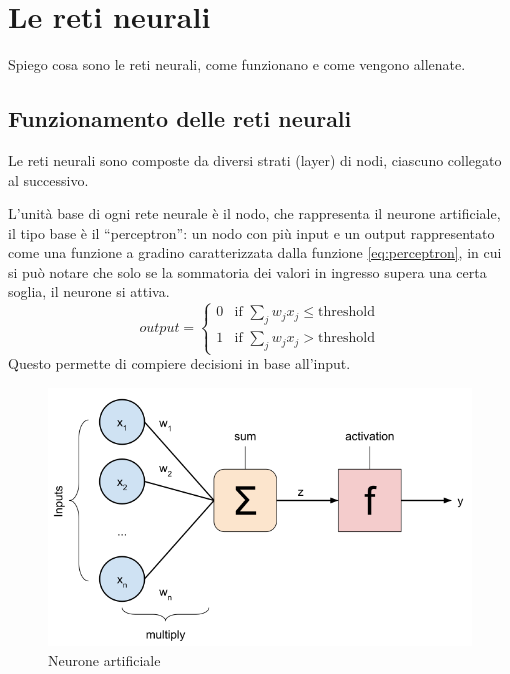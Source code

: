 \section{Le reti neurali}

Spiego cosa sono le reti neurali, come funzionano e come vengono allenate.
\subsection{Funzionamento delle reti neurali}

Le reti neurali sono composte da diversi strati (layer) di nodi, ciascuno collegato al successivo.

L'unità base di ogni rete neurale è il nodo, che rappresenta il neurone artificiale, il tipo base è il ``perceptron'': un nodo con più input e un output rappresentato come una funzione a gradino caratterizzata dalla funzione \ref{eq:perceptron}, in cui si può notare che solo se la sommatoria dei valori in ingresso supera una certa soglia, il neurone si attiva.
\[
\label{eq:perceptron}
output = \begin{cases}
    0 & \mbox{if } \sum_{j}{w_{j}x_{j}}\leq \mbox{threshold} \\
    1 &  \mbox{if } \sum_{j}{w_{j}x_{j}} > \mbox{threshold}
\end{cases}
\]
Questo permette di compiere decisioni in base all'input.

\begin{figure}[h]
    \label{fig:neurone}
    \includegraphics[width=\hsize]{images/reti_neurali/neurone.png}
    \caption{Neurone artificiale}
    \centering
\end{figure}

